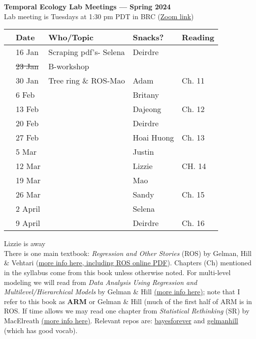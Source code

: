 \documentclass[11pt]{article}
\begin{document}
 
\raggedright
{}

\begin{center} 
{\large \textbf{Temporal Ecology Lab Meetings --- Spring 2024}} \\ [2pt]
Lab meeting is Tuesdays at 1:30 pm PDT in BRC (\href{https://ubc.zoom.us/j/69225274563?pwd=Vmd5NG1QL2h2bTRsQVVTYWJSb0hvQT09}{Zoom link})\\ %
\end{center} 

\begin{center}
\begin{tabular}{ p{0.2 cm}  p{2 cm}  p{4.5 cm}  p{3 cm}  p{3.5 cm} }  \hline \hline
 & \textbf{Date}
   & \textbf{Who/Topic}
      & \textbf{Snacks?} 
         & \textbf{Reading} \\ 
\hline \hline
&16 Jan & Scraping pdf's- Selena  &   Deirdre    & \\\hline
 & \sout{23 Jan} & B-workshop &  &  \\\hline
 & 30 Jan & Tree ring \& ROS-Mao & Adam & Ch. 11 \\\hline  
 & 6 Feb &  & Britany &   \\\hline
 & 13 Feb  &  & Dajeong &  Ch. 12 \\\hline 
 & 20 Feb &  & Deirdre &  \\\hline
 & 27 Feb  & & Hoai Huong & Ch. 13\\\hline
 & 5 Mar &  & Justin &  \\\hline 
  & 12 Mar  &   & Lizzie &  CH. 14 \\\hline
 & 19 Mar  & & Mao & \\\hline
  & 26 Mar  &  & Sandy & Ch. 15 \\\hline
 &  2 April &  & Selena &  \\\hline
 & 9 April  &  & Deirdre & Ch. 16 \\\hline
\hline
\end{tabular}
\end{center}
\noindent *Lizzie is away \\
There is one main textbook: \emph{Regression and Other Stories} (ROS) by Gelman, Hill \& Vehtari (\href{https://avehtari.github.io/ROS-Examples/}{more info here, including ROS online PDF}). Chapters (Ch) mentioned in the syllabus come from this book unless otherwise noted. For multi-level modeling we will read from \emph{Data Analysis Using Regression and Multilevel/Hierarchical Models} by Gelman \& Hill \href{http://www.stat.columbia.edu/~gelman/arm/}{(more info here)}; note that I refer to this book as {\bf ARM} or Gelman \& Hill (much of the first half of ARM is in ROS. If time allows we may read one chapter from \emph{Statistical Rethinking} (SR) by MacElreath \href{http://xcelab.net/rm/statistical-rethinking/}{(more info here)}. Relevant repos are: \href{https://github.com/temporalecologylab/bayesforever}{bayesforever} and \href{https://github.com/lizzieinvancouver/gelmanhill}{gelmanhill} (which has good vocab). \\
\end{document}
